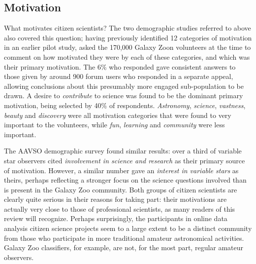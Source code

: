 \documentclass{ar2e}
\begin{document}

\subsection{Motivation}
\label{sec:crowd:motivation}


What motivates citizen scientists? The two demographic studies referred to above
also covered this question; having previously \citep{Rad++2010} identified 12
categories of motivation in an earlier pilot study, \citet{Rad++2013} asked the
170,000 Galaxy Zoon volunteers at the time to comment on how motivated they were
by each of these categories, and which was their primary motivation. The 6\% who
responded gave consistent answers to those given by around 900 forum users who
responded in a separate appeal, allowing conclusions about this presumably more
engaged sub-population to be drawn. A desire to {\it contribute} to science was
found to be the dominant primary motivation, being selected by 40\% of
respondents. {\it Astronomy}, {\it science}, {\it vastness}, {\it beauty} and 
{\it discovery} were all motivation categories that were found to very important
to the volunteers, while {\it fun}, {\it learning} and {\it community} were less
important. 

The AAVSO demographic survey \citep{P+P2012} found similar results: over a third
of variable star observers cited {\it involvement in science and research} as
their primary source of motivation. However, a similar number gave an {\it
interest in variable stars} as theirs, perhaps reflecting a stronger focus on
the science questions involved than is present in the Galaxy Zoo community. Both
groups of citizen scientists are clearly quite serious in their reasons for
taking part: their motivations are actually very close to those of professional
scientists, as many readers of this review will recognize. Perhaps surprisingly,
the participants in online data analysis citizen science projects seem to a
large extent to be a distinct community from those who participate in more
traditional amateur astronomical activities. Galaxy Zoo classifiers, for
example, are not, for the most part, regular amateur observers. 
\end{document}
